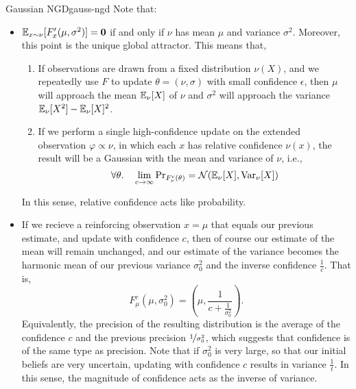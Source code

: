 \documentclass{article}
\begin{document}
\begin{examplex}{Gaussian NGD}{gauss-ngd}
	Note that:
	\begin{itemize}
		\item  $\operatorname*{\mathbb{E}}_{x \sim \nu} [ F'_x(\mu,\sigma^2) ] = \mathbf{0}$ if and only if $\nu$ has mean $\mu$ and variance $\sigma^2$.
		Moreover, this point is the unique global attractor.
		This means that,
		\begin{enumerate}
			\item If observations are drawn from a fixed distribution $\nu(X)$, and we repeatedly use $F$ to update $\theta = (\nu, \sigma)$ with small confidence $\epsilon$,
			then $\mu$ will approach the mean $\operatorname*{\mathbb{E}}_{\nu}[X]$ of $\nu$
			and $\sigma^2$ will approach the variance $\operatorname*{\mathbb{E}}_{\nu}[X^2] - \operatorname*{\mathbb{E}}_{\nu}[X]^2$.

			\item If we perform a single high-confidence update on the extended observation $\varphi \propto \nu$, in which each $x$ has relative confidence $\nu(x)$, the result will be a Gaussian with the mean and variance of $\nu$, i.e.,
			\[
				\forall \theta.\quad
				\lim_{c \to \infty} \Pr\nolimits_{F_{\nu}^c(\theta)} = \mathcal N(\operatorname*{\mathbb{E}}\nolimits_{\nu}[X], {\mathrm{Var}}_{\nu}[X])
			\]
		\end{enumerate}
		In this sense, relative confidence acts like probability.

		\item
		If we recieve a reinforcing observation $x = \mu$ that equals our previous estimate, and update with confidence $c$, then
		of course our estimate of the mean will remain unchanged, and our estimate of the variance becomes the harmonic mean of our previous variance $\sigma_0^2$ and the inverse confidence $\frac1c$.
		That is,
		\[
			F^c_\mu(\mu, \sigma_0^2) =
			\left(\mu, \frac{1}{c + \frac{1}{\sigma_0^2}} \right).
		\]
		Equivalently, the precision of the resulting distribution is the average of the confidence $c$ and the previous precision $\nicefrac{1}{\sigma_0^2}$, which suggests that confidence is of the same type as precision. 
		Note that if $\sigma_0^2$ is very large, so that our initial beliefs are very uncertain, updating with confidence $c$ results in variance $\frac1t$.
		In this sense, the magnitude of confidence acts as the inverse of variance.
	\end{itemize}
\end{examplex}
\end{document}
